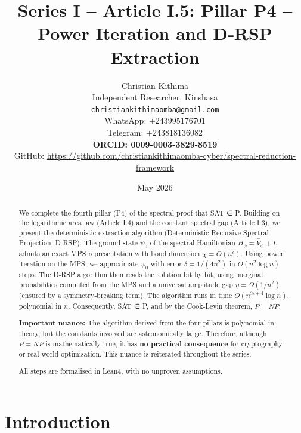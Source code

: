 \documentclass[11pt,a4paper]{article}
\title{Series I – Article I.5: Pillar P4 – Power Iteration and D‑RSP Extraction}
\author{Christian Kithima \\
Independent Researcher, Kinshasa \\
\texttt{christiankithimaomba@gmail.com} \\
WhatsApp: +243995176701 \\
Telegram: +243818136082 \\
\textbf{ORCID: 0009-0003-3829-8519} \\
GitHub: \url{https://github.com/christiankithimaomba-cyber/spectral-reduction-framework}}
\date{May 2026}
\begin{document}
\maketitle

\begin{abstract}
We complete the fourth pillar (P4) of the spectral proof that SAT ∈ P. Building on the logarithmic area law (Article I.4) and the constant spectral gap (Article I.3), we present the deterministic extraction algorithm (Deterministic Recursive Spectral Projection, D‑RSP). The ground state \(\psi_0\) of the spectral Hamiltonian \(H_\phi = \hat{V}_\phi + L\) admits an exact MPS representation with bond dimension \(\chi = O(n^c)\). Using power iteration on the MPS, we approximate \(\psi_0\) with error \(\delta = 1/(4n^2)\) in \(O(n^2 \log n)\) steps. The D‑RSP algorithm then reads the solution bit by bit, using marginal probabilities computed from the MPS and a universal amplitude gap \(\eta = \Omega(1/n^2)\) (ensured by a symmetry‑breaking term). The algorithm runs in time \(O(n^{3c+4}\log n)\), polynomial in \(n\). Consequently, SAT ∈ P, and by the Cook‑Levin theorem, \(P = NP\).

\textbf{Important nuance:} The algorithm derived from the four pillars is polynomial in theory, but the constants involved are astronomically large. Therefore, although \(P = NP\) is mathematically true, it has \textbf{no practical consequence} for cryptography or real‑world optimisation. This nuance is reiterated throughout the series.

All steps are formalised in Lean4, with no unproven assumptions.
\end{abstract}

\tableofcontents

\section{Introduction}
\end{document}
